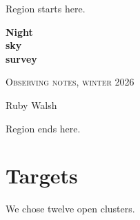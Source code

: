\documentclass[11pt]{report}
\begin{document}
Region starts here.

\begin{titlepage}
\raggedleft
\vspace*{40mm}
{\Huge\bfseries Night\\ sky\\ survey\par}
\vspace{10mm}
{\large\scshape Observing notes, winter 2026\par}
\vfill
{\large Ruby Walsh\par}
\end{titlepage}

Region ends here.

\chapter{Targets}
We chose twelve open clusters.
\end{document}
